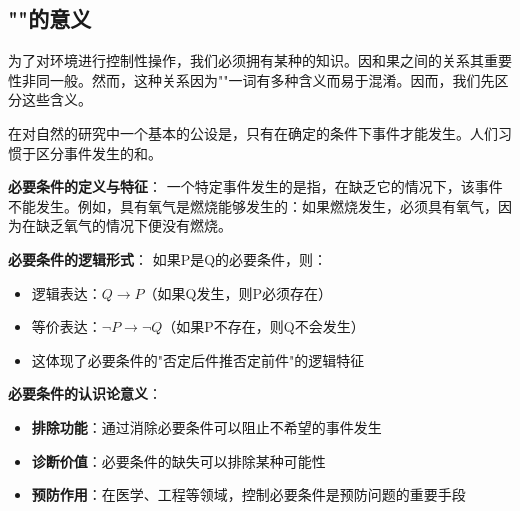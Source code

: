 \subsection{""的意义}

为了对环境进行控制性操作，我们必须拥有某种的知识。因和果之间的关系其重要性非同一般。然而，这种关系因为""一词有多种含义而易于混淆。因而，我们先区分这些含义。

\begin{theorembox}[title=必要条件与充分条件的深入分析]
在对自然的研究中一个基本的公设是，只有在确定的条件下事件才能发生。人们习惯于区分事件发生的和。

\textbf{必要条件的定义与特征}：
一个特定事件发生的是指，在缺乏它的情况下，该事件不能发生。例如，具有氧气是燃烧能够发生的：如果燃烧发生，必须具有氧气，因为在缺乏氧气的情况下便没有燃烧。

\textbf{必要条件的逻辑形式}：
如果P是Q的必要条件，则：
\begin{itemize}
\item 逻辑表达：$Q \rightarrow P$（如果Q发生，则P必须存在）
\item 等价表达：$\neg P \rightarrow \neg Q$（如果P不存在，则Q不会发生）
\item 这体现了必要条件的"否定后件推否定前件"的逻辑特征
\end{itemize}

\textbf{必要条件的认识论意义}：
\begin{itemize}
\item \textbf{排除功能}：通过消除必要条件可以阻止不希望的事件发生
\item \textbf{诊断价值}：必要条件的缺失可以排除某种可能性
\item \textbf{预防作用}：在医学、工程等领域，控制必要条件是预防问题的重要手段
\end{itemize}
\end{theorembox}


